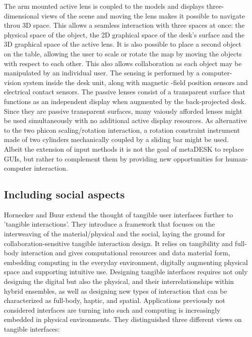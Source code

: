 The arm mounted active lens is coupled to the models and displays three-dimensional views of the scene and moving the lens makes it possible to navigate throu 3D space. This allows a seamless interaction with three spaces at once: the physical space of the object, the 2D graphical space of the desk's surface and the 3D graphical space of the active lens.
It is also possible to place a second object on the table, allowing the user to scale or rotate the map by moving the objects with respect to each other. This also allows collaboration as each object may be manipulated by an individual user. The sensing is performed by a computer-vision system inside the desk unit, along with magnetic -field position sensors and electrical contact sensors.
The passive lenses consist of a transparent surface that functions as an independent display when augmented by the back-projected desk. Since they are passive transparent surfaces, many vaiously afforded lenses might be used simultaneously with no additional active display resources.
As alternative to the two phicon scaling/rotation interaction, a rotation constraint instrument made of two cylinders mechanically coupled by a sliding bar might be used.
Albeit the extension of input methods it is not the goal of metaDESK to replace GUIs, but rather to complement them by providing new opportunities for human-computer interaction. 



\subsection{Including social aspects}

Hornecker and Buur \cite{hornecker06} extend the thought of tangible user interfaces further to 'tangible interactions'. They introduce a framework that focuses on the interweaving of the material/physical and the social, laying the ground for collaboration-sensitive tangible interaction design. It relies on tangibility and full-body interaction and gives computational resources and data material form, embedding computing in the everyday environment, digitally augmenting physical space and supporting intuitive use. Designing tangible interfaces requires not only designing the digital but also the physical, and their interrelationships within hybrid ensembles, as well as designing new types of interaction that can be characterized as full-body, haptic, and spatial.
Applications previously not considered interfaces are turning into such and computing is increasingly embedded in physical environments.
They distinguished three different views on tangible interfaces:

